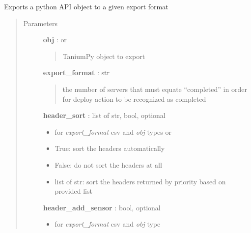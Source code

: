 \documentclass[letterpaper,10pt,english]{sphinxmanual}
\begin{document}
\begin{fulllineitems}
\label{pytan.handler:pytan.handler.Handler.export_obj}
Exports a python API object to a given export format
\begin{quote}\begin{description}
\item[{Parameters}] \leavevmode
\textbf{obj} : {\hyperref[taniumpy.object_types:taniumpy.object_types.base.BaseType]{}} or {\hyperref[taniumpy.object_types:taniumpy.object_types.result_set.ResultSet]{}}
\begin{quote}

TaniumPy object to export
\end{quote}

\textbf{export\_format} : str
\begin{quote}

the number of servers that must equate ``completed'' in order for deploy action to be recognized as completed
\end{quote}

\textbf{header\_sort} : list of str, bool, optional
\begin{itemize}
\item {} 
for \emph{export\_format} csv and \emph{obj} types {\hyperref[taniumpy.object_types:taniumpy.object_types.base.BaseType]{}} or {\hyperref[taniumpy.object_types:taniumpy.object_types.result_set.ResultSet]{}}

\item {} 
True: sort the headers automatically

\item {} 
False: do not sort the headers at all

\item {} 
list of str: sort the headers returned by priority based on provided list

\end{itemize}

\textbf{header\_add\_sensor} : bool, optional
\begin{itemize}
\item {} 
for \emph{export\_format} csv and \emph{obj} type {\hyperref[taniumpy.object_types:taniumpy.object_types.result_set.ResultSet]{}}


\end{itemize}
\end{description}
\end{quote}
\end{fulllineitems}
\end{document}
